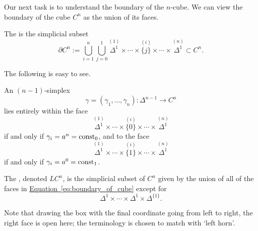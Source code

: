 \documentclass[main.tex]{subfiles}
\begin{document}
Our next task is to understand the boundary of the $n$-cube. We can view the boundary of the cube $C^{n}$ as the union of its faces.

\begin{definition}
  \label{def:boundary_of_n-cube}
  The  is the simplicial subset
  \begin{equation}
    \label{eq:boundary_of_cube}
    \partial C^{n} := \bigcup_{i = 1}^{n} \bigcup_{j = 0}^{1} \overset{(1)}{\Delta^{1}} \times \cdots \times \overset{(i)}{\{j\}} \times \cdots \times \overset{(n)}{\Delta^{1}} \subset C^{n}.
  \end{equation}
\end{definition}

The following is easy to see.
\begin{proposition}
  \label{prop:simplex_intersect_faces}
  An $(n-1)$-simplex
  \begin{equation*}
    \gamma = (\gamma_{1}, \ldots, \gamma_{n})\colon \Delta^{n-1} \to C^{n}
  \end{equation*}
  lies entirely within the face
  \begin{equation*}
    \overset{(1)}{\Delta^{1}} \times \cdots \times \overset{(i)}{\{0\}} \times \cdots \times \overset{(n)}{\Delta^{1}}
  \end{equation*}
  if and only if $\gamma_{i} = a^{n} = \mathrm{const}_{0}$, and to the face
  \begin{equation*}
    \overset{(1)}{\Delta^{1}} \times \cdots \times \overset{(i)}{\{1\}} \times \cdots \times \overset{(n)}{\Delta^{1}}
  \end{equation*}
  if and only if $\gamma_{i} = a^0 = \mathrm{const}_{1}$.
\end{proposition}

\begin{definition}
  \label{def:left_box}
  The , denoted $LC^{n}$, is the simplicial subset of $C^{n}$ given by the union of all of the faces in \hyperref[eq:boundary_of_cube]{Equation~\ref*{eq:boundary_of_cube}} except for
  \begin{equation*}
    \Delta^{1} \times \cdots \times \Delta^{1} \times \Delta^{\{1\}}.
  \end{equation*}

  Note that drawing the box with the final coordinate going from left to right, the right face is open here; the terminology is chosen to match with `left horn'.
\end{definition}
\end{document}

